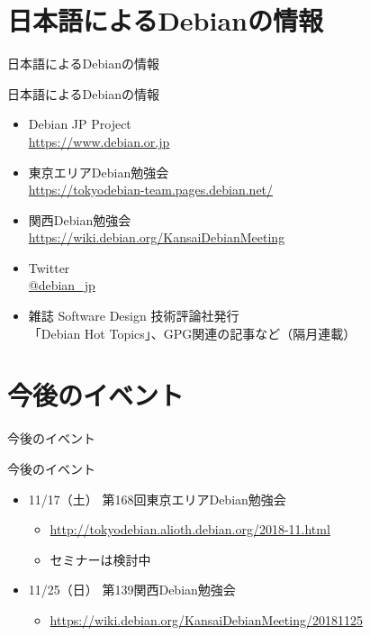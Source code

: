 \documentclass[cjk,dvipdfmx,10pt,compress,%
hyperref={bookmarks=true,bookmarksnumbered=true,bookmarksopen=false,%
colorlinks=false,%
pdftitle={第 132 回 関西 Debian 勉強会},%
pdfauthor={かわだ},%
pdfsubject={資料},%
}]{beamer}
\begin{document}
\section{日本語によるDebianの情報}
\begin{frame}\begin{center}\Huge{日本語によるDebianの情報}\end{center}\end{frame}
\begin{frame}{日本語によるDebianの情報}
\begin{itemize}
  \item Debian JP Project \\
      \url{https://www.debian.or.jp}
  \item 東京エリアDebian勉強会\\
      \url{https://tokyodebian-team.pages.debian.net/}
  \item 関西Debian勉強会 \\
      \url{https://wiki.debian.org/KansaiDebianMeeting}
  \item Twitter \\
      \url{@debian_jp}
  \item  雑誌 Software Design 技術評論社発行 \\
    「Debian Hot Topics」、GPG関連の記事など（隔月連載）
\end{itemize}
\end{frame}

\section{今後のイベント}
\begin{frame}\begin{center}\Huge{今後のイベント}\end{center}\end{frame}
\begin{frame}{今後のイベント}
\begin{itemize}
\item 11/17（土） 第168回東京エリアDebian勉強会
  \begin{itemize}
    \item \url{http://tokyodebian.alioth.debian.org/2018-11.html}
    \item セミナーは検討中
  \end{itemize}
\item 11/25（日） 第139関西Debian勉強会
  \begin{itemize}
      \item \url{https://wiki.debian.org/KansaiDebianMeeting/20181125}
  \end{itemize}
\end{itemize}
\end{frame}
\end{document}
